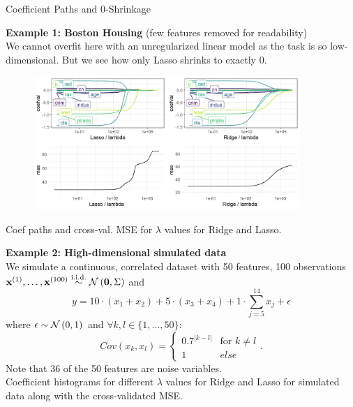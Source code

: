 \documentclass[11pt,compress,t,notes=noshow, xcolor=table]{beamer}
\begin{document}
\begin{vbframe}{Coefficient Paths and 0-Shrinkage}

\textbf{Example 1: Boston Housing} (few features removed for readability) \\

We cannot overfit here with an unregularized linear model as the task is so low-dimensional. But we see how only Lasso shrinks to exactly 0.

\begin{figure}
\includegraphics[width=0.9\textwidth]{figure/shrinkage_1.png}\\
\end{figure}

Coef paths and cross-val. MSE for $\lambda$ values for Ridge and Lasso.

\framebreak
\textbf{Example 2: High-dimensional simulated data} \\
We simulate a continuous, correlated dataset with 50 features, 100 observations $\mathbf{x}^{(1)},\dots, \mathbf{x}^{(100)} \overset{\text{i.i.d.}}{\sim} \mathcal{N} \left(\mathbf{0}, \Sigma \right)$ and 
$$ y = 10 \cdot (x_1 + x_2) + 5 \cdot (x_3 + x_4) + 1 \cdot \sum_{j = 5}^{14} x_j + \epsilon $$
where $\epsilon \sim \mathcal{N} \left(0, 1\right)$ and $ \forall k, l \in \{1, ..., 50\}$: 
$$Cov(x_k, x_l) = 
  \begin{cases}
   0.7^{|k-l|} & \text{for } k \neq l \\
   1 & else 
   \end{cases}. 
$$ 
Note that 36 of the 50 features are noise variables. \\
\framebreak 
Coefficient histograms for different $\lambda$ values for Ridge and Lasso for simulated data along with the cross-validated MSE.


\end{vbframe}
\end{document}
